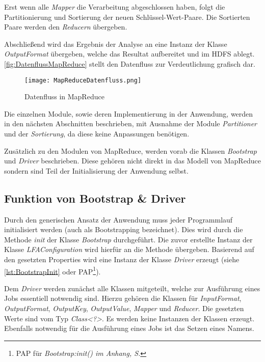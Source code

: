 Erst wenn alle \textit{Mapper} die Verarbeitung abgeschlossen haben, folgt die Partitionierung und Sortierung der neuen Schlüssel-Wert-Paare. Die Sortierten Paare werden den \textit{Reducern} übergeben.

Abschließend wird das Ergebnis der Analyse an eine Instanz der Klasse \textit{OutputFormat} übergeben, welche das Resultat aufbereitet und im \ac{HDFS} ablegt. \autoref{fig:DatenflussMapReduce} stellt den Datenfluss zur Verdeutlichung grafisch dar.

\begin{figure}[h]
	\centering
	\texttt{[image: MapReduceDatenfluss.png]}
	\caption{Datenfluss in MapReduce\footnotemark}
	\label{fig:DatenflussMapReduce}
\end{figure}

Die einzelnen Module, sowie deren Implementierung in der Anwendung, werden in den nächsten Abschnitten beschrieben, mit Ausnahme der Module \textit{Partitioner} und der \textit{Sortierung}, da diese keine Anpassungen benötigen.

Zusätzlich zu den Modulen von MapReduce, werden vorab die Klassen \textit{Bootstrap} und \textit{Driver} beschrieben. Diese gehören nicht direkt in das Modell von MapReduce sondern sind Teil der Initialisierung der Anwendung selbst.

\subsection{Funktion von Bootstrap \& Driver}
Durch den generischen Ansatz der Anwendung muss jeder Programmlauf initialisiert werden (auch als \gls{Bootstrapping} bezeichnet). Dies wird durch die Methode \textit{init} der Klasse \textit{Bootstrap} durchgeführt. Die zuvor erstellte Instanz der Klasse \textit{LFAConfiguration} wird hierfür an die Methode übergeben. Basierend auf den gesetzten Properties wird eine Instanz der Klasse \textit{Driver} erzeugt (siehe \autoref{lst:BootstrapInit} oder \ac{PAP}\footnote{\ac{PAP} für \textit{Bootstrap:init() im Anhang, S. \pageref{subsec:PAPBootstrapInit}}}).

Dem \textit{Driver} werden zunächst alle Klassen mitgeteilt, welche zur Ausführung eines Jobs essentiell notwendig sind. Hierzu gehören die Klassen für \textit{InputFormat}, \textit{OutputFormat}, \textit{OutputKey}, \textit{OutputValue}, \textit{Mapper} und \textit{Reducer}. Die gesetzten Werte sind vom Typ \textit{Class<?>}. Es werden keine Instanzen der Klassen erzeugt. Ebenfalls notwendig für die Ausführung eines Jobs ist das Setzen eines Namens.

